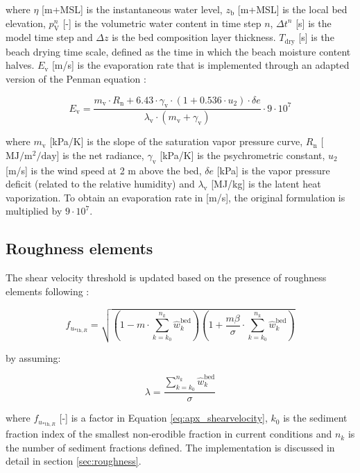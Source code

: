 \noindent where $\eta$ [m+MSL] is the instantaneous water level,
$z_{\mathrm{b}}$ [m+MSL] is the local bed elevation,
$p_{\mathrm{V}}^n$ [-] is the volumetric water content in time step
$n$, $\Delta t^n$ [s] is the model time step and $\Delta z$ is the bed
composition layer thickness. $T_{\mathrm{dry}}$ [s] is the beach
drying time scale, defined as the time in which the beach moisture
content halves. $E_{\mathrm{v}}$ [m/s] is the evaporation rate that is
implemented through an adapted version of the Penman equation
\citep{Shuttleworth1993}:

\begin{equation}
  \label{eq:apx_penman}
  E_{\mathrm{v}} = \frac{m_{\mathrm{v}} \cdot R_{\mathrm{n}} + 6.43 \cdot \gamma_{\mathrm{v}} \cdot (1 + 0.536 \cdot u_2) \cdot \delta e}
  {\lambda_{\mathrm{v}} \cdot (m_{\mathrm{v}} + \gamma_{\mathrm{v}})} \cdot 9 \cdot 10^7
\end{equation}

\noindent where $m_{\mathrm{v}}$ [kPa/K] is the slope of the
saturation vapor pressure curve, $R_{\mathrm{n}}$
[$\mathrm{MJ/m^2/day}$] is the net radiance, $\gamma_{\mathrm{v}}$
[kPa/K] is the psychrometric constant, $u_2$ [m/s] is the wind speed
at 2 m above the bed, $\delta e$ [kPa] is the vapor pressure deficit
(related to the relative humidity) and $\lambda_{\mathrm{v}}$ [MJ/kg]
is the latent heat vaporization. To obtain an evaporation rate in
[m/s], the original formulation is multiplied by $9 \cdot 10^7$.

\subsection{Roughness elements}

The shear velocity threshold is updated based on the presence of
roughness elements following \citet{Raupach1993}:

\begin{equation}
  f_{u_{\mathrm{* th},R}} = \sqrt{(1 - m \cdot \sum_{k=k_0}^{n_k}{\hat{w}_k^{\mathrm{bed}}})
    (1 + \frac{m \beta}{\sigma} \cdot \sum_{k=k_0}^{n_k}{\hat{w}_k^{\mathrm{bed}}})}
\end{equation}

\noindent by assuming:

\begin{equation}
  \lambda = \frac{\sum_{k=k_0}^{n_k}{\hat{w}_k^{\mathrm{bed}}}}{\sigma}
\end{equation}

\noindent where $f_{u_{\mathrm{* th},R}}$ [-] is a factor in Equation
\ref{eq:apx_shearvelocity}, $k_0$ is the sediment fraction index of
the smallest non-erodible fraction in current conditions and $n_k$ is
the number of sediment fractions defined. The implementation is
discussed in detail in section \ref{sec:roughness}.

